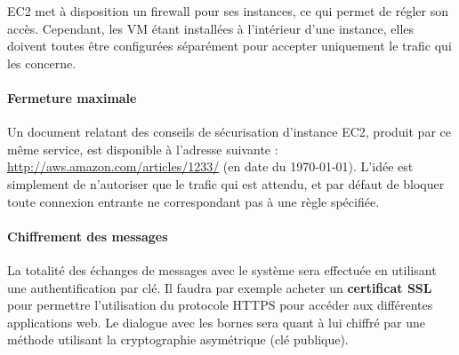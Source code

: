 EC2 met à disposition un firewall pour ses instances, ce qui permet de régler
son accès. Cependant, les VM étant installées à l'intérieur d'une instance,
elles doivent toutes être configurées séparément pour accepter uniquement le
trafic qui les concerne.

\paragraph{Fermeture maximale}

Un document relatant des conseils de sécurisation d'instance EC2, produit par
ce même service, est disponible à l'adresse suivante :
\url{http://aws.amazon.com/articles/1233/} (en date du \today). L'idée est
simplement de n'autoriser que le trafic qui est attendu, et par défaut de
bloquer toute connexion entrante ne correspondant pas à une règle spécifiée.

\paragraph{Chiffrement des messages}

La totalité des échanges de messages avec le système sera effectuée en
utilisant une authentification par clé. Il faudra par exemple acheter un
\textbf{certificat SSL} pour permettre l'utilisation du protocole HTTPS pour
accéder aux différentes applications web. Le dialogue avec les bornes sera
quant à lui chiffré par une méthode utilisant la cryptographie asymétrique (clé
publique).


